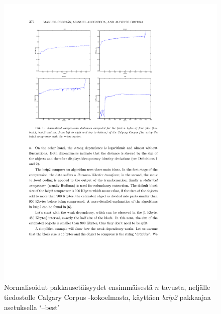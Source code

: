 \documentclass[12pt,finnish]{tktltiki2}
\theoremstyle{definition}
\theoremstyle{remark}
\begin{document}
    \begin{figure}
      \begin{center}
        \immediate{}
          \includegraphics{img/bzip2-best}
      \end{center}
      \caption{Normalisoidut pakkausetäisyydet ensimmäisestä $n$ tavusta, neljälle tiedostolle Calgary Corpus -kokoelmasta, käyttäen \emph{bzip2} pakkaajaa asetuksella `--best' \cite{cebrian2005common}}
      \label{fig:(bzip2-best)}
    \end{figure}
\end{document}
